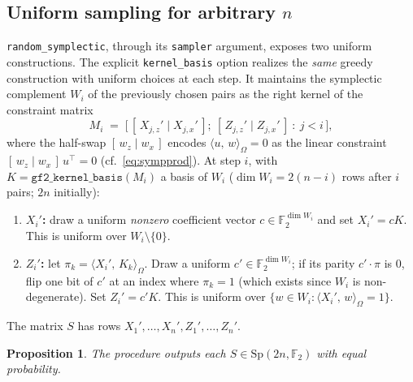 \documentclass[11pt]{article}
\theoremstyle{definition}
\theoremstyle{plain}
\newtheorem{proposition}[definition]{Proposition}
\newcommand{\F}{\mathbb{F}}
\newcommand{\Sp}{\mathrm{Sp}}
\newcommand{\sympprod}[2]{\langle #1,\, #2\rangle_{\Omega}}
\begin{document}
\subsection{Uniform sampling for arbitrary \texorpdfstring{$n$}{n}}
\label{sec:sampling}
\texttt{random\_symplectic}, through its \texttt{sampler} argument, exposes two
uniform constructions. The explicit \texttt{kernel\_basis} option realizes the
\emph{same} greedy construction with uniform choices at each step. It maintains the
symplectic complement $W_i$ of the previously chosen pairs as the right kernel
of the constraint matrix
\[
  M_i \;=\; \Big[\, [\,X_{j,z}'\mid X_{j,x}'\,];\ [\,Z_{j,z}'\mid Z_{j,x}'\,]
            \ :\ j<i \,\Big],
\]
where the half-swap $[\,w_z\mid w_x\,]$ encodes $\sympprod{u}{w}=0$ as the
linear constraint $[\,w_z\mid w_x\,]\,u^{\!\top}=0$ (cf.~\eqref{eq:sympprod}).
At step $i$, with $K=\texttt{gf2\_kernel\_basis}(M_i)$ a basis of $W_i$
($\dim W_i = 2(n-i)$ rows after $i$ pairs; $2n$ initially):
\begin{enumerate}[leftmargin=2em]
\item \textbf{$X_i'$:} draw a uniform \emph{nonzero} coefficient vector
  $c\in\F_2^{\dim W_i}$ and set $X_i'=cK$. This is uniform over $W_i\setminus\{0\}$.
\item \textbf{$Z_i'$:} let $\pi_k=\sympprod{X_i'}{K_k}$. Draw a uniform
  $c'\in\F_2^{\dim W_i}$; if its parity $c'\!\cdot\!\pi$ is $0$, flip one bit of
  $c'$ at an index where $\pi_k=1$ (which exists since $W_i$ is non-degenerate).
  Set $Z_i'=c'K$. This is uniform over $\{w\in W_i:\sympprod{X_i'}{w}=1\}$.
\end{enumerate}
The matrix $S$ has rows $X_1',\dots,X_n',Z_1',\dots,Z_n'$.
\begin{proposition}
The procedure outputs each $S\in\Sp(2n,\F_2)$ with equal probability.
\end{proposition}
\end{document}
